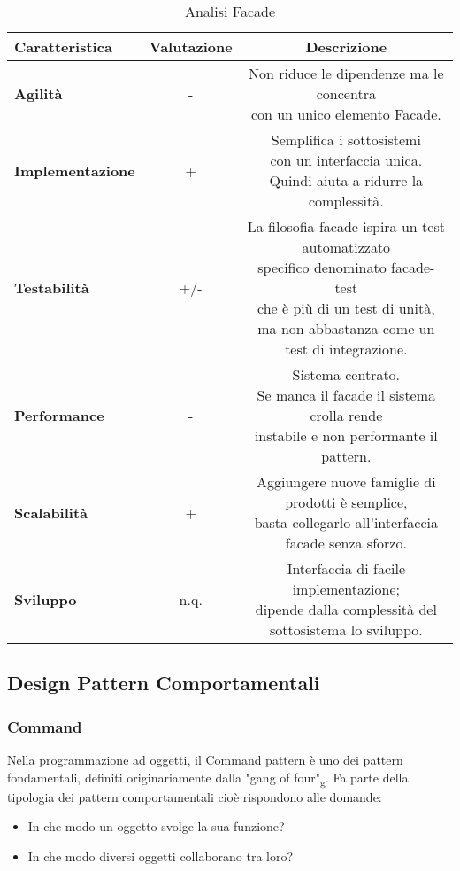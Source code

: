 {{{\begin{itemize}
				\small %
				{\renewcommand\arraystretch{1.2} %
					\begin{center} \begin{table} \begin{tabular}{|l|c|c|}
						\hline
						{\textbf{Caratteristica}}&{\textbf{Valutazione}}&{\textbf{Descrizione}}\\
						\hline
						\textbf{Agilità} & - &  \minitab[c]{Non riduce le dipendenze ma le concentra\\ con un unico elemento Facade.} \\
						\hline
						\textbf{Implementazione} & + &  \minitab[c]{Semplifica i sottosistemi\\ con un interfaccia unica.\\Quindi aiuta a ridurre la complessità.}  \\
						\hline
						\textbf{Testabilità} & +/- &  \minitab[c]{La filosofia facade ispira un test automatizzato\\specifico denominato facade-test\\che è più di un test di unità,\\ma non abbastanza come un test di integrazione.} \\
						\hline
						\textbf{Performance} & - & \minitab[c]{Sistema centrato.\\Se manca il facade il sistema crolla rende\\instabile e non performante il pattern.}\\
						\hline
						\textbf{Scalabilità} & + & \minitab[c]{Aggiungere nuove famiglie di prodotti è semplice,\\basta collegarlo all'interfaccia facade senza sforzo.}\\
						\hline
						\textbf{Sviluppo} & n.q. &  \minitab[c]{Interfaccia di facile implementazione;\\dipende dalla complessità del sottosistema lo sviluppo.}\\
						\hline
					\end{tabular}
				\caption{Analisi Facade}
				\label{AFA}
			\end{table}	
			 \end{center}
				}
			\end{itemize}
		}
	}
	\subsection{Design Pattern Comportamentali}{
		\subsubsection{Command}{
			Nella programmazione ad oggetti, il Command pattern è uno dei pattern fondamentali, definiti originariamente dalla "gang of four"\textsubscript{g}. Fa parte della tipologia dei pattern comportamentali cioè rispondono alle domande: 
			\begin{itemize}
				\item In che modo un oggetto svolge la sua funzione?
				\item In che modo diversi oggetti collaborano tra loro?
			\end{itemize}
		
}}}

